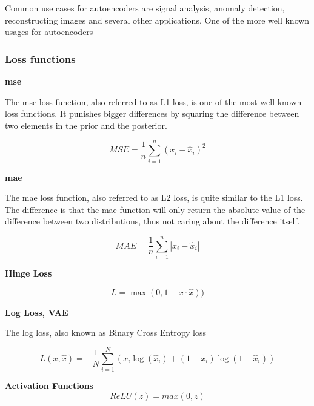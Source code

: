 Common use cases for autoencoders are signal analysis, anomaly detection, reconstructing images and several other applications. 
One of the more well known usages for autoencoders

\subsubsection{Loss functions}

\textbf{\acrfull{mse}}

The \acrshort{mse} loss function, also referred to as L1 loss, is one of the most well known loss functions. It punishes bigger differences by squaring the difference between two elements in the prior and the posterior.

\begin{equation}
    MSE = \dfrac{1}{n}  \sum_{i=1}^{n}(x_i-\hat{x}_i)^2
\end{equation}

\textbf{\acrfull{mae}}

The \acrshort{mae} loss function, also referred to as L2 loss, is quite similar to the L1 loss. The difference is that the \acrshort{mae} function will only return the absolute value of the difference between two distributions, thus not caring about the difference itself.

\begin{equation}
    MAE = \dfrac{1}{n}  \sum_{i=1}^{n}|x_i-\hat{x}_i|
\end{equation}

\textbf{Hinge Loss}

\begin{equation}
    L = \max(0, 1 - x \cdot \hat{x}))
\end{equation}

\textbf{Log Loss, VAE}

The log loss, also known as Binary Cross Entropy loss

\begin{equation}
L(x, \hat{x}) = - \frac{1}{N} \sum_{i=1}^{N} \left( x_i \log(\hat{x}_i) + (1 - x_i) \log(1 - \hat{x}_i) \right)
\end{equation}


\textbf{Activation Functions}
\begin{equation}
    ReLU(z) = max(0, z)
\end{equation}

